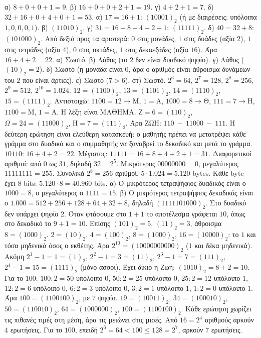  α) $8+0+0+1=9$. β) $16+0+0+2+1=19$. γ) $4+2+1=7$. δ) $32+16+0+4+0+1=53$.
 α) $17=16+1$: $(10001)_2$ (ή με διαιρέσεις: υπόλοιπα $1,0,0,0,1$). β) $(11010)_2$. γ) $31=16+8+4+2+1$: $(11111)_2$. δ) $40=32+8$: $(101000)_2$.
 Από δεξιά προς τα αριστερά: $0$ στις μονάδες, $1$ στις δυάδες (αξία $2$), $1$ στις τετράδες (αξία $4$), $0$ στις οκτάδες, $1$ στις δεκαεξάδες (αξία $16$). Άρα $16+4+2=22$.
 α) Σωστό. β) Λάθος (το $2$ δεν είναι δυαδικό ψηφίο). γ) Λάθος ($(10)_2=2$). δ) Σωστό (η μονάδα είναι $0$, άρα ο αριθμός είναι άθροισμα δυνάμεων του $2$ που είναι άρτιες). ε) Σωστό ($7>6$). στ) Σωστό.
 $2^6=64$, $2^7=128$, $2^8=256$, $2^9=512$, $2^{10}=1.024$.
 $12=(1100)_2$, $13=(1101)_2$, $14=(1110)_2$, $15=(1111)_2$.
 Αντιστοιχώ: $1100=12\to\mathrm{Μ}$, $1=\mathrm{Α}$, $1000=8\to\mathrm{Θ}$, $111=7\to\mathrm{Η}$, $1100=\mathrm{Μ}$, $1=\mathrm{Α}$. Η λέξη είναι $\mathrm{ΜΑΘΗΜΑ}$.
 $\mathrm{Ζ}=6=(110)_2$, $\Omega=24=(11000)_2$, $\mathrm{Η}=7=(111)_2$. Άρα $\mathrm{ΖΩΗ}$: $110\ -\ 11000\ -\ 111$. Η δεύτερη ερώτηση είναι ελεύθερη κατασκευή: ο μαθητής πρέπει να μετατρέψει κάθε γράμμα στο δυαδικό και ο συμμαθητής να ξαναβρεί το δεκαδικό και μετά το γράμμα.
 $10110$: $16+4+2=22$. Μέγιστος: $11111=16+8+4+2+1=31$. Διαφορετικοί αριθμοί: από $0$ ως $31$, δηλαδή $32=2^5$.
 Μικρότερος $00000000=0$, μεγαλύτερος $11111111=255$. Συνολικά $2^8=256$ αριθμοί.
 $5\cdot 1.024=5.120$ bytes. Κάθε byte έχει $8$ bits: $5.120\cdot 8=40.960$ bits.
 α) Ο μικρότερος τετραψήφιος δυαδικός είναι ο $1000=8$, ο μεγαλύτερος ο $1111=15$. β) Ο μικρότερος τετραψήφιος δεκαδικός είναι ο $1.000=512+256+128+64+32+8$, δηλαδή $(1111101000)_2$.
 Στο δυαδικό δεν υπάρχει ψηφίο $2$. Όταν φτάσουμε στο $1+1$ το αποτέλεσμα γράφεται $10$, όπως στο δεκαδικό το $9+1=10$. Επίσης $(101)_2=5$, $(11)_2=3$, άθροισμα $8=(1000)_2$.
 $2=(10)_2$, $4=(100)_2$, $8=(1000)_2$, $16=(10000)_2$: το $1$ και τόσα μηδενικά όσος ο εκθέτης. Άρα $2^{10}=(10000000000)_2$ ($1$ και δέκα μηδενικά). Ακόμη $2^1-1=1=(1)_2$, $2^2-1=3=(11)_2$, $2^3-1=7=(111)_2$, $2^4-1=15=(1111)_2$ (μόνο άσσοι).
 Έχει δίκιο η Ζωή: $(1010)_2=8+2=10$. Για το $100$: $100:2=50$ υπόλοιπο $0$, $50:2=25$ υπόλοιπο $0$, $25:2=12$ υπόλοιπο $1$, $12:2=6$ υπόλοιπο $0$, $6:2=3$ υπόλοιπο $0$, $3:2=1$ υπόλοιπο $1$, $1:2=0$ υπόλοιπο $1$. Άρα $100=(1100100)_2$, με $7$ ψηφία.
 $19=(10011)_2$, $34=(100010)_2$, $50=(110010)_2$, $64=(1000000)_2$, $100=(1100100)_2$.
 Κάθε ερώτηση χωρίζει τις πιθανές τιμές στη μέση, άρα τις μειώνει στις μισές. Από $16=2^4$ αριθμούς αρκούν $4$ ερωτήσεις. Για το $100$, επειδή $2^6=64<100\le 128=2^7$, αρκούν $7$ ερωτήσεις.
